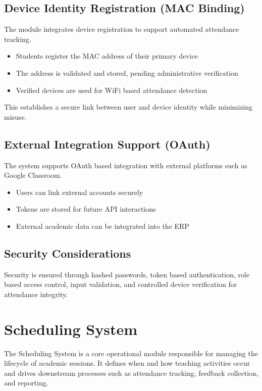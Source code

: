 \subsection{Device Identity Registration (MAC Binding)}

The module integrates device registration to support automated attendance tracking.

\begin{itemize}
    \item Students register the MAC address of their primary device
    \item The address is validated and stored, pending administrative verification
    \item Verified devices are used for WiFi based attendance detection
\end{itemize}

This establishes a secure link between user and device identity while minimizing misuse.

\subsection{External Integration Support (OAuth)}

The system supports OAuth based integration with external platforms such as Google Classroom.

\begin{itemize}
    \item Users can link external accounts securely
    \item Tokens are stored for future API interactions
    \item External academic data can be integrated into the ERP
\end{itemize}

\subsection{Security Considerations}

Security is ensured through hashed passwords, token based authentication, role based access
control, input validation, and controlled device verification for attendance integrity.

\section{Scheduling System}

The Scheduling System is a core operational module responsible for managing the lifecycle of
academic sessions. It defines when and how teaching activities occur and drives downstream
processes such as attendance tracking, feedback collection, and reporting.

